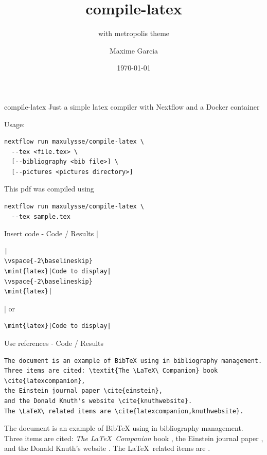 \documentclass{beamer}
\author{Maxime Garcia}
\date{\today}
\institute{maxulysse}
\subtitle{with metropolis theme}
\title{compile-latex}
\begin{document}
\maketitle

\begin{frame}[fragile]{compile-latex}
  Just a simple latex compiler with Nextflow and a Docker container

  Usage:
  \begin{verbatim}
nextflow run maxulysse/compile-latex \
  --tex <file.tex> \
  [--bibliography <bib file>] \
  [--pictures <pictures directory>]
  \end{verbatim}
  This pdf was compiled using
  \begin{verbatim}
nextflow run maxulysse/compile-latex \
  --tex sample.tex
  \end{verbatim}
\end{frame}

\begin{frame}[fragile]{Insert code - Code / Results}
\tiny
\mint{latex}|\begin{verbatim}|
\vspace{-2\baselineskip}
\mint{latex}|Code to display|
\vspace{-2\baselineskip}
\mint{latex}|\end{verbatim}|
or
\begin{verbatim}
\mint{latex}|Code to display|
\end{verbatim}
\end{frame}

\begin{frame}[fragile]{Use references - Code / Results}
\begin{verbatim}
The document is an example of BibTeX using in bibliography management.
Three items are cited: \textit{The \LaTeX\ Companion} book \cite{latexcompanion},
the Einstein journal paper \cite{einstein},
and the Donald Knuth's website \cite{knuthwebsite}.
The \LaTeX\ related items are \cite{latexcompanion,knuthwebsite}.
\end{verbatim}
The document is an example of BibTeX using in bibliography management.
Three items are cited: \textit{The \LaTeX\ Companion} book \cite{latexcompanion},
the Einstein journal paper \cite{einstein},
and the Donald Knuth's website \cite{knuthwebsite}.
The \LaTeX\ related items are \cite{latexcompanion,knuthwebsite}.
\end{frame}
\end{document}

